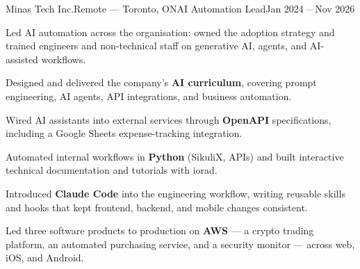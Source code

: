\begin{cvjob}{Minas Tech Inc.}{Remote --- Toronto, ON}{AI Automation Lead}{Jan 2024 -- Nov 2026}
  \item Led AI automation across the organisation: owned the adoption strategy and trained engineers and non-technical staff on generative AI, agents, and AI-assisted workflows.
  \item Designed and delivered the company's \textbf{AI curriculum}, covering prompt engineering, AI agents, API integrations, and business automation.
  \item Wired AI assistants into external services through \textbf{OpenAPI} specifications, including a Google Sheets expense-tracking integration.
  \item Automated internal workflows in \textbf{Python} (SikuliX, APIs) and built interactive technical documentation and tutorials with iorad.
  \item Introduced \textbf{Claude Code} into the engineering workflow, writing reusable skills and hooks that kept frontend, backend, and mobile changes consistent.
  \item Led three software products to production on \textbf{AWS} --- a crypto trading platform, an automated purchasing service, and a security monitor --- across web, iOS, and Android.
\end{cvjob}

